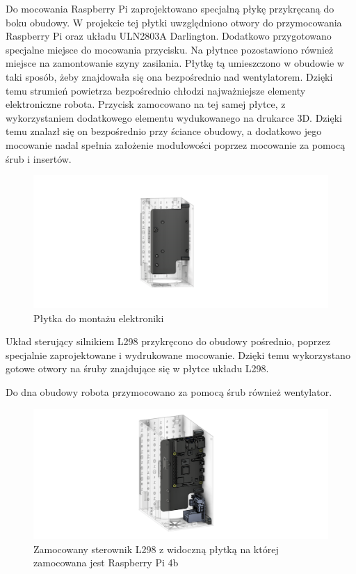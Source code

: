 Do mocowania Raspberry Pi zaprojektowano specjalną płykę przykręcaną do boku obudowy. W projekcie tej płytki uwzględniono otwory do przymocowania Raspberry
Pi oraz układu ULN2803A Darlington. Dodatkowo przygotowano specjalne miejsce do mocowania przycisku. Na płytnce pozostawiono również miejsce
na zamontowanie szyny zasilania. Płytkę tą umieszczono w obudowie w taki sposób, żeby znajdowała się ona bezpośrednio nad wentylatorem. Dzięki temu
strumień powietrza bezpośrednio chłodzi najważniejsze elementy elektroniczne robota. Przycisk zamocowano na tej samej płytce, z wykorzystaniem
dodatkowego elementu wydukowanego na drukarce 3D. Dzięki temu znalazł się on bezpośrednio przy ściance obudowy, a dodatkowo jego mocowanie
nadal spełnia założenie modułowości poprzez mocowanie za pomocą śrub i insertów.

\begin{figure}[H]
    \centering
    \includegraphics[width=0.95\linewidth]{chapters/03-praca-wlasna/figures/main_board.png}
    \caption{\label{fig:mainboard}Płytka do montażu elektroniki}
\end{figure}

Układ sterujący silnikiem L298 przykręcono do obudowy pośrednio, poprzez specjalnie zaprojektowane i wydrukowane mocowanie. Dzięki temu wykorzystano
gotowe otwory na śruby znajdujące się w płytce układu L298.

Do dna obudowy robota przymocowano za pomocą śrub również wentylator.

\begin{figure}[H]
    \centering
    \includegraphics[width=0.95\linewidth]{chapters/03-praca-wlasna/figures/l298n.png}
    \caption{\label{fig:steownik}Zamocowany sterownik L298 z widoczną płytką na której zamocowana jest Raspberry Pi 4b}
\end{figure}

